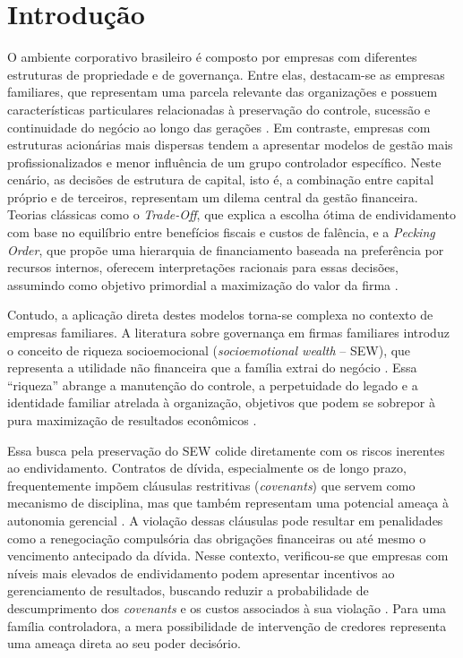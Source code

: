 \chapter{Introdução}\label{cap:introducao}

O ambiente corporativo brasileiro é composto por empresas com diferentes
estruturas de propriedade e de governança. Entre elas, destacam-se as empresas
familiares, que representam uma parcela relevante das organizações e possuem
características particulares relacionadas à preservação do controle, sucessão e
continuidade do negócio ao longo das gerações \cite{pestana2021}. Em contraste,
empresas com estruturas acionárias mais dispersas tendem a apresentar modelos de
gestão mais profissionalizados e menor influência de um grupo controlador
específico. Neste cenário, as decisões de estrutura de capital, isto é, a
combinação entre capital próprio e de terceiros, representam um dilema central da
gestão financeira. Teorias clássicas como o \textit{Trade-Off}, que explica a
escolha ótima de endividamento com base no equilíbrio entre benefícios fiscais e
custos de falência, e a \textit{Pecking Order}, que propõe uma hierarquia de
financiamento baseada na preferência por recursos internos, oferecem
interpretações racionais para essas decisões, assumindo como objetivo primordial a
maximização do valor da firma \cite{myers1984,myersmajluf1984}.

Contudo, a aplicação direta destes modelos torna-se complexa no contexto de
empresas familiares. A literatura sobre governança em firmas familiares introduz o
conceito de riqueza socioemocional (\textit{socioemotional wealth} -- SEW), que
representa a utilidade não financeira que a família extrai do negócio
\cite{gomezmejia2007}. Essa
``riqueza'' abrange a manutenção do controle, a perpetuidade do legado e a
identidade familiar atrelada à organização, objetivos que podem se sobrepor à pura
maximização de resultados econômicos \cite{santos2018}.

Essa busca pela preservação do SEW colide diretamente com os riscos inerentes ao
endividamento. Contratos de dívida, especialmente os de longo prazo, frequentemente
impõem cláusulas restritivas (\textit{covenants}) que servem como mecanismo de
disciplina, mas que também representam uma potencial ameaça à autonomia gerencial
\cite{costa2018}. A violação dessas cláusulas pode resultar em penalidades como a
renegociação compulsória das obrigações financeiras ou até mesmo o vencimento
antecipado da dívida. Nesse contexto, verificou-se que empresas com níveis mais
elevados de endividamento podem apresentar incentivos ao gerenciamento de
resultados, buscando reduzir a probabilidade de descumprimento dos
\textit{covenants} e os custos associados à sua violação \cite{costa2018}. Para
uma família controladora, a mera possibilidade de intervenção de credores
representa uma ameaça direta ao seu poder decisório.

